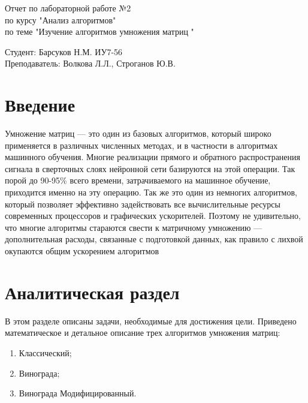 \documentclass[a4paper, 14pt]{article}
\begin{document}
	\begin{titlepage}
		\begin{center}
			\begin{LARGE}
				Отчет по лабораторной работе №2\\
				по курсу "Анализ алгоритмов"\\
				по теме "Изучение алгоритмов умножения матриц "
			\end{LARGE}
			
			\begin{Large}
				\vspace{10cm}
				Студент: Барсуков Н.М. ИУ7-56\\
				Преподаватель: Волкова Л.Л.,
				Строганов Ю.В.
			\end{Large}
		\end{center}
	\end{titlepage}
	
	\tableofcontents
	
	\newpage
	\section*{Введение}
	
	Умножение матриц — это один из базовых алгоритмов, который широко применяется в различных численных методах, и в частности в алгоритмах машинного обучения. Многие реализации прямого и обратного распространения сигнала в сверточных слоях нейронной сети базируются на этой операции. Так порой до 90-95\% всего времени, затрачиваемого на машинное обучение, приходится именно на эту операцию. Так же это один из немногих алгоритмов, который позволяет эффективно задействовать все вычислительные ресурсы современных процессоров и графических ускорителей. Поэтому не удивительно, что многие алгоритмы стараются свести к матричному умножению — дополнительная расходы, связанные с подготовкой данных, как правило с лихвой окупаются общим ускорением алгоритмов

	\newpage
	\section{Аналитическая раздел}
	
	В этом разделе описаны задачи, необходимые для достижения цели. Приведено математическое и детальное описание трех алгоритмов умножения матриц:
	
	\begin{enumerate}
		\item Классический;
		\item Винограда;
		\item Винограда Модифицированный.
	\end{enumerate}
	
\end{document}
